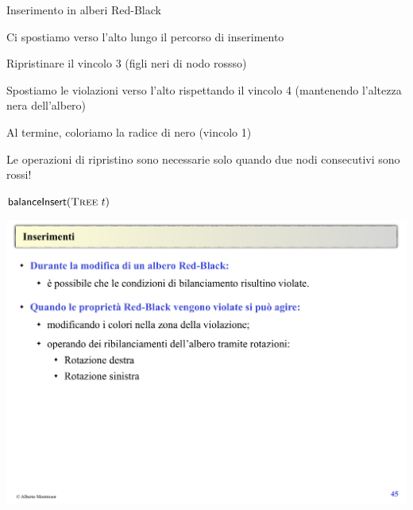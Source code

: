 \begin{frame}{Inserimento in alberi Red-Black}

\begin{myboxtitle}
\BIL
\item Ci spostiamo verso l’alto lungo il percorso di inserimento 
\item Ripristinare il vincolo 3 (figli neri di nodo rossso)
\item Spostiamo le violazioni verso l’alto rispettando il vincolo 4 (mantenendo l’altezza nera dell’albero)
\item Al termine, coloriamo la radice di nero (vincolo 1)
\EIL
\end{myboxtitle}

\begin{myboxtitle}[Nota]
Le operazioni di ripristino sono necessarie solo quando due nodi consecutivi sono rossi!
\end{myboxtitle}

\end{frame}

\begin{frame}{$\textsf{balanceInsert}(\Tree\ t)$}

\includegraphics[width=1.0\textwidth,page=9]{redblack2.pdf}

\end{frame}

